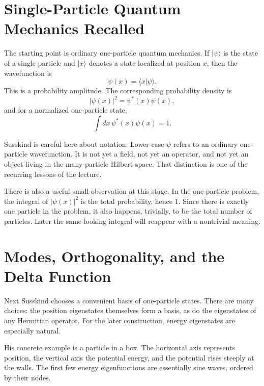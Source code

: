 \section{Single-Particle Quantum Mechanics Recalled}

The starting point is ordinary one-particle quantum mechanics. If $|\psi\rangle$ is the state of a single particle and $|x\rangle$ denotes a state localized at position $x$, then the wavefunction is
\begin{equation}
\psi(x)=\langle x|\psi\rangle.
\end{equation}
This is a probability amplitude. The corresponding probability density is
\begin{equation}
|\psi(x)|^2=\psi^*(x)\psi(x),
\end{equation}
and for a normalized one-particle state,
\begin{equation}
\int dx\,\psi^*(x)\psi(x)=1.
\end{equation}

Susskind is careful here about notation. Lower-case $\psi$ refers to an ordinary one-particle wavefunction. It is not yet a field, not yet an operator, and not yet an object living in the many-particle Hilbert space. That distinction is one of the recurring lessons of the lecture.

There is also a useful small observation at this stage. In the one-particle problem, the integral of $|\psi(x)|^2$ is the total probability, hence $1$. Since there is exactly one particle in the problem, it also happens, trivially, to be the total number of particles. Later the same-looking integral will reappear with a nontrivial meaning.

\section{Modes, Orthogonality, and the Delta Function}

Next Susskind chooses a convenient basis of one-particle states. There are many choices: the position eigenstates themselves form a basis, as do the eigenstates of any Hermitian operator. For the later construction, energy eigenstates are especially natural.

His concrete example is a particle in a box. The horizontal axis represents position, the vertical axis the potential energy, and the potential rises steeply at the walls. The first few energy eigenfunctions are essentially sine waves, ordered by their nodes.

